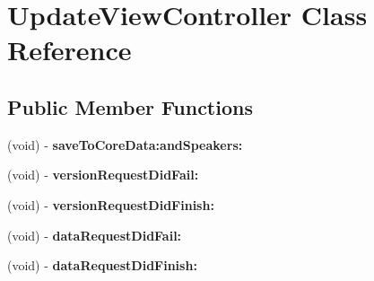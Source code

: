 \hypertarget{interface_update_view_controller}{
\section{UpdateViewController Class Reference}
\label{interface_update_view_controller}
}
\subsection*{Public Member Functions}
\begin{DoxyCompactItemize}
\item 
\hypertarget{interface_update_view_controller_ae5412656ce54405164313394c6021c1f}{
(void) -\/ {\bfseries saveToCoreData:andSpeakers:}}
\label{interface_update_view_controller_ae5412656ce54405164313394c6021c1f}

\item 
\hypertarget{interface_update_view_controller_ac4b9a4e6feb10400a6fd1a89ab54436a}{
(void) -\/ {\bfseries versionRequestDidFail:}}
\label{interface_update_view_controller_ac4b9a4e6feb10400a6fd1a89ab54436a}

\item 
\hypertarget{interface_update_view_controller_acbdae1fe1d42ad2a46715551a54a796c}{
(void) -\/ {\bfseries versionRequestDidFinish:}}
\label{interface_update_view_controller_acbdae1fe1d42ad2a46715551a54a796c}

\item 
\hypertarget{interface_update_view_controller_acab00a92a9ce3f0cc3204d5d249f1879}{
(void) -\/ {\bfseries dataRequestDidFail:}}
\label{interface_update_view_controller_acab00a92a9ce3f0cc3204d5d249f1879}

\item 
\hypertarget{interface_update_view_controller_a5b28ad9f89ca27fcb11ad6179605b59a}{
(void) -\/ {\bfseries dataRequestDidFinish:}}
\label{interface_update_view_controller_a5b28ad9f89ca27fcb11ad6179605b59a}

\end{DoxyCompactItemize}
